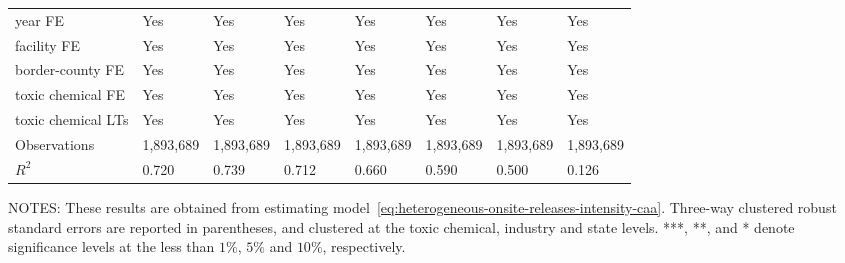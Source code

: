 \begin{table}[H]
{\begin{tabular}{@{}llllllll@{}}
            year FE                         & Yes       & Yes           & Yes       & Yes          & Yes             & Yes           & Yes                 \\
            facility FE                     & Yes       & Yes           & Yes       & Yes          & Yes             & Yes           & Yes                 \\
            border-county FE                & Yes       & Yes           & Yes       & Yes          & Yes             & Yes           & Yes                 \\
            toxic chemical FE               & Yes       & Yes           & Yes       & Yes          & Yes             & Yes           & Yes                 \\
            toxic chemical LTs              & Yes       & Yes           & Yes       & Yes          & Yes             & Yes           & Yes                 \\\midrule
            Observations                    & 1,893,689 & 1,893,689     & 1,893,689 & 1,893,689    & 1,893,689       & 1,893,689     & 1,893,689           \\
            $R^2$                           & 0.720     & 0.739         & 0.712     & 0.660        & 0.590           & 0.500         & 0.126               \\ \bottomrule\bottomrule
        \end{tabular}%
    }
    \begin{minipage}{\columnwidth}
        \vspace{0.05in}
        \tiny NOTES: These results are obtained from estimating model~\ref{eq:heterogeneous-onsite-releases-intensity-caa}. Three-way clustered robust standard errors are reported in parentheses, and clustered at the toxic chemical, industry and state levels. ***, **, and * denote significance levels at the less than $1\%$, $5\%$ and $10\%$, respectively.
    \end{minipage}
\end{table}